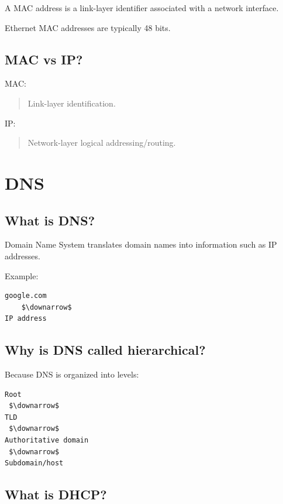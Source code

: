 A MAC address is a link-layer identifier associated with a network interface.

Ethernet MAC addresses are typically 48 bits.

\medskip

\subsection{MAC vs IP?}

MAC:

\begin{quote}
Link-layer identification.\\
\end{quote}

IP:

\begin{quote}
Network-layer logical addressing/routing.\\
\end{quote}

\medskip

\section{DNS}

\subsection{What is DNS?}

Domain Name System translates domain names into information such as IP addresses.

Example:

\begin{lstlisting}
google.com
    $\downarrow$
IP address
\end{lstlisting}

\medskip

\subsection{Why is DNS called hierarchical?}

Because DNS is organized into levels:

\begin{lstlisting}
Root
 $\downarrow$
TLD
 $\downarrow$
Authoritative domain
 $\downarrow$
Subdomain/host
\end{lstlisting}

\medskip

\subsection{What is DHCP?}

